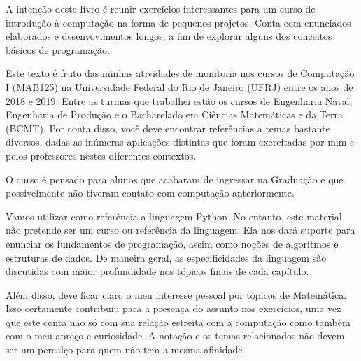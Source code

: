 \preface%
    A intenção deste livro é reunir exercícios interessantes para um curso de introdução à computação na forma de pequenos projetos. Conta com enunciados elaborados e desenvovimentos longos, a fim de explorar alguns dos conceitos básicos de programação. \par

    Este texto é fruto das minhas atividades de monitoria nos cursos de Computação I (MAB125) na Universidade Federal do Rio de Janeiro (UFRJ) entre os anos de 2018 e 2019. Entre as turmas que trabalhei estão os cursos de Engenharia Naval, Engenharia de Produção e o Bacharelado em Ciências Matemáticas e da Terra (BCMT). Por conta disso, você deve encontrar referências a temas bastante diversos, dadas as inúmeras aplicações distintas que foram exercitadas por mim e pelos professores nestes diferentes contextos. \par

    O curso é pensado para alunos que acabaram de ingressar na Graduação e que possivelmente não tiveram contato com computação anteriormente. \par

    Vamos utilizar como referência a linguagem Python. No entanto, este material não pretende ser um curso ou referência da linguagem. Ela nos dará suporte para enunciar os fundamentos de programação, assim como noções de algoritmos e estruturas de dados. De maneira geral, as especificidades da linguagem são discutidas com maior profundidade nos tópicos finais de cada capítulo. \par

    Além disso, deve ficar claro o meu interesse pessoal por tópicos de Matemática. Isso certamente contribuiu para a presença do assunto nos exercícios, uma vez que este conta não só com sua relação estreita com a computação como também com o meu apreço e curiosidade. A notação e os temas relacionados não devem ser um percalço para quem não tem a mesma afinidade\par
    

